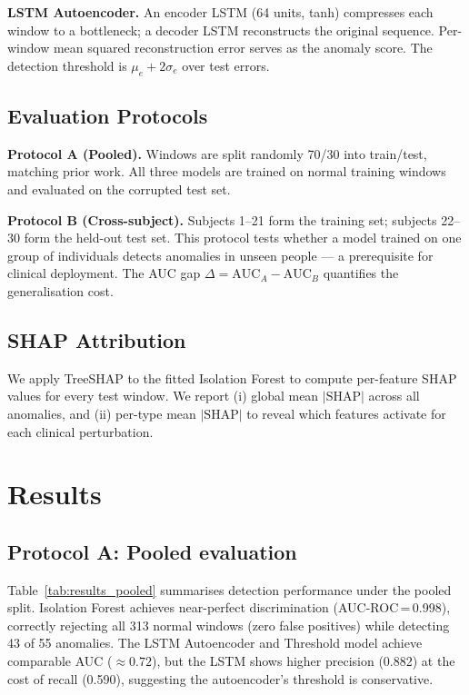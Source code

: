 \documentclass[conference]{IEEEtran}
\begin{document}
\textbf{LSTM Autoencoder.}
An encoder LSTM (64 units, tanh) compresses each window to a bottleneck;
a decoder LSTM reconstructs the original sequence.
Per-window mean squared reconstruction error serves as the anomaly score.
The detection threshold is $\mu_e + 2\sigma_e$ over test errors.

\subsection{Evaluation Protocols}

\textbf{Protocol A (Pooled).}
Windows are split randomly 70/30 into train/test, matching prior work.
All three models are trained on normal training windows and evaluated
on the corrupted test set.

\textbf{Protocol B (Cross-subject).}
Subjects 1–21 form the training set; subjects 22–30 form the held-out
test set.
This protocol tests whether a model trained on one group of individuals
detects anomalies in unseen people — a prerequisite for clinical deployment.
The AUC gap $\Delta = \text{AUC}_A - \text{AUC}_B$ quantifies the
generalisation cost.

\subsection{SHAP Attribution}

We apply TreeSHAP \cite{lundberg2017} to the fitted Isolation Forest to
compute per-feature SHAP values for every test window.
We report (i) global mean $|\text{SHAP}|$ across all anomalies, and
(ii) per-type mean $|\text{SHAP}|$ to reveal which features activate
for each clinical perturbation.

\section{Results}

\subsection{Protocol A: Pooled evaluation}

Table~\ref{tab:results_pooled} summarises detection performance under
the pooled split.
Isolation Forest achieves near-perfect discrimination (AUC-ROC\,=\,0.998),
correctly rejecting all 313 normal windows (zero false positives) while
detecting 43 of 55 anomalies.
The LSTM Autoencoder and Threshold model achieve comparable AUC ($\approx 0.72$),
but the LSTM shows higher precision (0.882) at the cost of recall (0.590),
suggesting the autoencoder's threshold is conservative.
\end{document}
